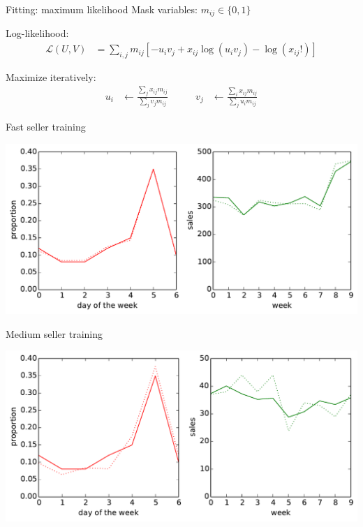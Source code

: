 \documentclass{beamer}
\begin{document}
\begin{frame}{Fitting: maximum likelihood}
 Mask variables: $m_{ij} \in \{0,1\}$
 \vspace{0.5cm}
 
 Log-likelihood:
 \begin{align}
  \mathcal{L}(U,V) &= \sum_{i,j} m_{ij} \left[ -u_i v_j + x_{ij}\log(u_i v_j) - \log(x_{ij}!) \right]
 \end{align}
 
 Maximize iteratively:
 \begin{align}
  u_i &\leftarrow \frac{\sum_j x_{ij} m_{ij}}{\sum_j v_{j} m_{ij}} & \qquad v_j &\leftarrow \frac{\sum_i x_{ij} m_{ij}}{\sum_j u_{i} m_{ij}}
 \end{align}
\end{frame}

\begin{frame}{Fast seller training}
  \begin{center}
  \includegraphics[width=0.8\columnwidth]{fast_learning.pdf}
 \end{center}
\end{frame}

\begin{frame}{Medium seller training}
  \begin{center}
  \includegraphics[width=0.8\columnwidth]{medium_learning.pdf}
 \end{center}
\end{frame}
\end{document}
